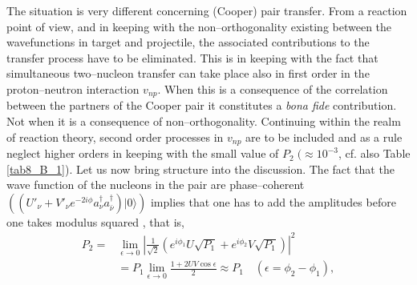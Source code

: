 The situation is very different concerning (Cooper) pair transfer. From a reaction point of view, and in keeping with the non--orthogonality existing between the wavefunctions in target and projectile, the associated contributions to the transfer process have to be eliminated. This is in keeping with the fact that simultaneous two--nucleon transfer can take place also in first order in the proton--neutron interaction     $v_{np}$. When this is a consequence of the correlation between the partners of the Cooper pair  it constitutes a \emph{bona fide} contribution. Not when it is a consequence of non--orthogonality. Continuing within the realm of reaction theory, second order processes in $v_{np}$ are to be included  and as a rule neglect higher orders in keeping with the small value of $P_2 \;(\approx10^{-3}$, cf. also Table \ref{tab8_B_1}). Let us now bring structure into the discussion. The fact that the wave function of the nucleons in the pair are phase--coherent $(\left(U'_\nu+V'_\nu e^{-2i\phi}a_\nu^\dagger a_{\bar\nu}^\dagger\right)|0\rangle)$ implies that one has to add the amplitudes before one takes modulus squared , that is,
\begin{align}\label{eq3.2.19}
\nonumber P_2=&\lim_{\epsilon\rightarrow 0}\left|\frac{1}{\sqrt{2}}\left(e^{i\phi_1}U\sqrt{P_1}+e^{i\phi_2}V\sqrt{P_1}\right)\right|^2\\
&=P_1 \lim_{\epsilon\rightarrow 0} \frac{1+2UV\cos\epsilon}{2}\approx P_1\quad (\epsilon=\phi_2-\phi_1),
\end{align}
